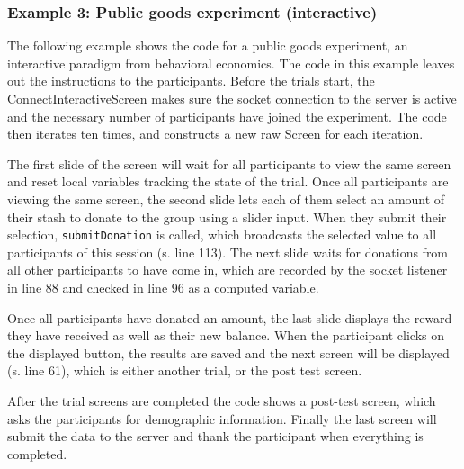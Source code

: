 \documentclass[a4paper,10pt]{paper}
\begin{document}
\subsubsection{Example 3: Public goods experiment (interactive)}
The following example shows the code for a public goods experiment, an interactive paradigm from behavioral economics. The code in this example leaves out the instructions to the participants. Before the trials start, the ConnectInteractiveScreen makes sure the socket connection to the server is active and the necessary number of participants have joined the experiment. The code then iterates ten times, and constructs a new raw Screen for each iteration.

The first slide of the screen will wait for all participants to view the same screen and reset local variables tracking the state of the trial. Once all participants are viewing the same screen, the second slide lets each of them select an amount of their stash to donate to the group using a slider input. When they submit their selection, \texttt{submitDonation} is called, which broadcasts the selected value to all participants of this session (s. line 113). The next slide waits for donations from all other participants to have come in, which are recorded by the socket listener in line 88 and checked in line 96 as a computed variable.

Once all participants have donated an amount, the last slide displays the reward they have received as well as their new balance. When the participant clicks on the displayed button, the results are saved and the next screen will be displayed (s. line 61), which is either another trial, or the post test screen.

After the trial screens are completed the code shows a post-test screen, which asks the participants for demographic information. Finally the last screen will submit the data to the server and thank the participant when everything is completed.
\end{document}

